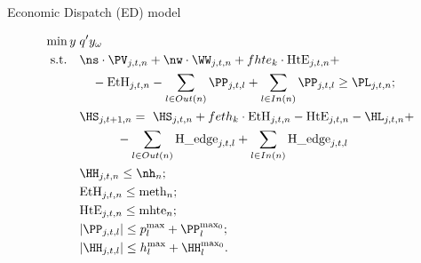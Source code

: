   
  \begin{frame}{Economic Dispatch (ED) model \; }
    \pause \pause
  
  
    \begin{align}
      \min{y} \; & q'y_{\omega} \nonumber \\
      \text{s.t.}\quad &  \ns \cdot \PV_{j,t,n} + \nw \cdot \WW_{j,t,n} + fhte_k \cdot\text{HtE}_{j,t,n} + \\
                  & \quad - \text{EtH}_{j,t,n} - \sum_{l\in Out(n)} \PP_{j,t,l} + \sum_{l\in In(n)} \PP_{j,t,l} \geq \PL_{j,t,n}; \nonumber \\
                  & \HS_{j,t+1,n}   =\  \HS_{j,t,n} + feth_k \cdot \text{EtH}_{j,t,n} - \text{HtE}_{j,t,n} - \HL_{j,t,n} +\\
                  & \quad \quad \quad - \sum_{l\in Out(n)}\text{H\_edge}_{j,t,l} + \sum_{l\in In(n)}\text{H\_edge}_{j,t,l} \nonumber \\
                  & \text{\HH}_{j,t,n} \leq \nh_n ;\\
                  & \text{EtH}_{j,t,n} \leq \text{meth}_n;\\
                  & \text{HtE}_{j,t,n} \leq \text{mhte}_n ; \\
                  & |\PP_{j,t,l}| \leq p^{\text{max}}_l + \PP^{\text{max}_0}_l ;\\
                  & |\HH_{j,t,l}|\leq h^{\text{max}}_l + \HH^{\text{max}_0}_l.
    \end{align}
    
                

\end{frame}
